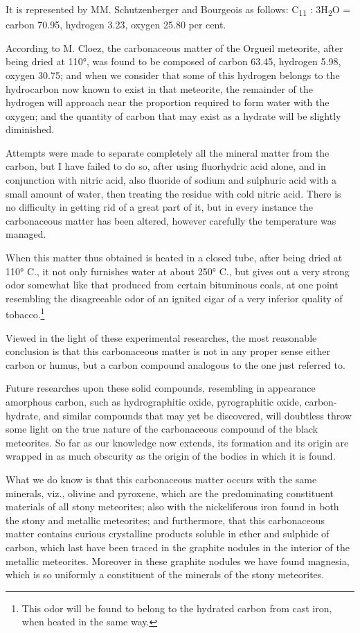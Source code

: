 \documentclass[a4paper, 11pt, oneside, english]{article}
\begin{document}
It is represented by MM. Schutzenberger and Bourgeois as follows: C\textsubscript{11} : 3H\textsubscript{2}O = carbon 70.95, hydrogen 3.23, oxygen 25.80 per cent.

According to M. Cloez, the carbonaceous matter of the Orgueil meteorite, after being dried at 110°, was found to be composed of carbon 63.45, hydrogen 5.98, oxygen 30.75; and when we consider that some of this hydrogen belongs to the hydrocarbon now known to exist in that meteorite, the remainder of the hydrogen will approach near the proportion required to form water with the oxygen; and the quantity of carbon that may exist as a hydrate will be slightly diminished.

Attempts were made to separate completely all the mineral matter from the carbon, but I have failed to do so, after using fluorhydric acid alone, and in conjunction with nitric acid, also fluoride of sodium and sulphuric acid with a small amount of water, then treating the residue with cold nitric acid. There is no difficulty in getting rid of a great part of it, but in every instance the carbonaceous matter has been altered, however carefully the temperature was managed.

When this matter thus obtained is heated in a closed tube, after being dried at 110° C., it not only furnishes water at about 250° C., but gives out a very strong odor somewhat like that produced from certain bituminous coals, at one point resembling the disagreeable odor of an ignited cigar of a very inferior quality of tobacco.\footnote{This odor will be found to belong to the hydrated carbon from cast iron, when heated in the same way.}

Viewed in the light of these experimental researches, the most reasonable conclusion is that this carbonaceous matter is not in any proper sense either carbon or humus, but a carbon compound analogous to the one just referred to.

Future researches upon these solid compounds, resembling in appearance amorphous carbon, such as hydrographitic oxide, pyrographitic oxide, carbon-hydrate, and similar compounds that may yet be discovered, will doubtless throw some light on the true nature of the carbonaceous compound of the black meteorites. So far as our knowledge now extends, its formation and its origin are wrapped in as much obscurity as the origin of the bodies in which it is found.

What we do know is that this carbonaceous matter occurs with the same minerals, viz., olivine and pyroxene, which are the predominating constituent materials of all stony meteorites; also with the nickeliferous iron found in both the stony and metallic meteorites; and furthermore, that this carbonaceous matter contains curious crystalline products soluble in ether and sulphide of carbon, which last have been traced in the graphite nodules in the interior of the metallic meteorites. Moreover in these graphite nodules we have found magnesia, which is so uniformly a constituent of the minerals of the stony meteorites.
\end{document}
